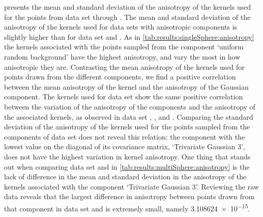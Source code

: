 	 presents the mean and standard deviation of the anisotropy of the kernels used for the points from data set \ferdosiTwo through \baakmanThree.
	The mean and standard deviation of the anisotropy of the kernels used for data sets with anisotropic components is slightly higher than for data set \ferdosiTwo and \ferdosiThree.
	As in \cref{tab:results:singleSphere:anisotropy} the kernels associated with the points sampled from the component `uniform random background' have the highest anisotropy, and vary the most in how anisotropic they are.
	Contrasting the mean anisotropy of the kernels used for points drawn from the different components, we find a positive correlation between the mean anisotropy of the kernel and the anisotropy of the Gaussian component.
		The kernels used for data set \baakmanTwo show the same positive correlation between the variation of the anisotropy of the components and the anisotropy of the associated kernels, as observed in data set \baakmanOne, \baakmanFour, and \baakmanFive.
		Comparing the standard deviation of the anisotropy of the kernels used for the points sampled from the components of data set \baakmanThree does not reveal this relation: the component with the lowest value on the diagonal of its covariance matrix, `Trivariate Gaussian 3', does not have the highest variation in kernel anisotropy.
	One thing that stands out when comparing data set \ferdosiThree and \baakmanThree in \cref{tab:results:multiSphere:anisotropy} is the lack of difference in the mean and standard deviation in the anisotropy of the kernels associated with the component `Trivariate Gaussian 3'. Reviewing the raw data reveals that the largest difference in anisotropy between points drawn from that component in data set \ferdosiThree and \baakmanThree is extremely small, namely \num{3.108624e-15}.

